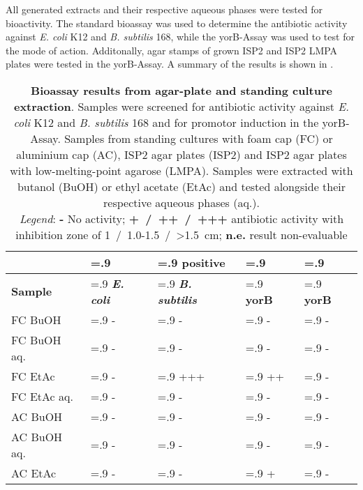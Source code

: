     All generated extracts and their respective aqueous phases were tested for bioactivity.
    The standard bioassay was used to determine the antibiotic activity against \textit{E. coli} K12 and \textit{B. subtilis} 168, while the yorB-Assay was used to test for the mode of action.
    Additonally, agar stamps of grown ISP2 and ISP2 LMPA plates were tested in the yorB-Assay.
    A summary of the results is shown in .

    \begin{table}[htbp]
        \caption[Bioassay results from agar-plate and standing culture extraction]{%
        	\textbf{Bioassay results from agar-plate and standing culture extraction}.
	        Samples were screened for antibiotic activity against \textit{E. coli} K12 and \textit{B. subtilis} 168 and for promotor induction in the yorB-Assay.
	        Samples from standing cultures with foam cap (FC) or aluminium cap (AC), ISP2 agar plates (ISP2) and ISP2 agar plates with low-melting-point agarose (LMPA).
	        Samples were extracted with butanol (BuOH) or ethyl acetate (EtAc) and tested alongside their respective aqueous phases (aq.).\\
	        \emph{Legend}: \textbf{-} No activity; \textbf{+~/~++~/~+++} antibiotic activity with inhibition zone of 1~/~1.0-1.5~/~>1.5~cm; \textbf{n.e.} result non-evaluable}
        \label{tab:yorB_assay_results}
        \centering
        \begin{tabularx}{\textwidth}{>{\hsize=1.4\hsize}X>{\hsize=.9\hsize}X>{\hsize=.9\hsize}X>{\hsize=.9\hsize}X>{\hsize=.9\hsize}X}
            \toprule
            & \multicolumn{3}{c}{Antibacterial} & positive \\
            \cline{2-4}
            \textbf{Sample} & \textbf{\textit{E. coli}}     & \textbf{\textit{B. subtilis}}  & \textbf{yorB}  & \textbf{yorB}    \\
            \midrule
            FC BuOH         & -     & -     & -     & -    \\
            FC BuOH aq.     & -     & -     & -     & -    \\
            FC EtAc         & -     & +++   & ++    & -    \\
            FC EtAc aq.     & -     & -     & -     & -    \\
            AC BuOH         & -     & -     & -     & -    \\
            AC BuOH aq.     & -     & -     & -     & -    \\
            AC EtAc         & -     & -     & +     & -    \\

\end{tabularx}
\end{table}
